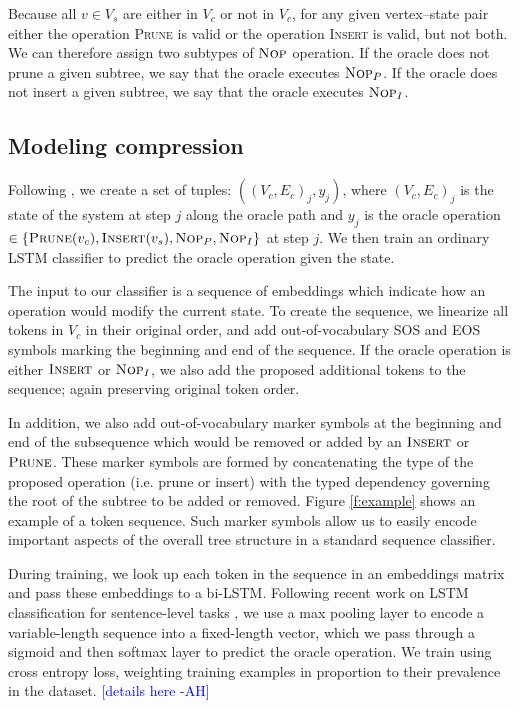 \documentclass[11pt,a4paper]{article}
\newcommand{\ahcomment}[1]{\textcolor{blue}{[#1 -AH]}}
\begin{document}
Because all $v \in V_s$ are either in $V_c$ or not in $V_c$, for any given vertex--state pair either the operation \textsc{Prune} is valid or the operation \textsc{Insert} is valid, but not both. We can therefore assign two subtypes of $\textsc{Nop}$ operation. If the oracle does not prune a given subtree, we say that the oracle executes $\textsc{Nop}_P$. If the oracle does not insert a given subtree, we say that the oracle executes $\textsc{Nop}_I$.

\subsection{Modeling compression}

Following \citet{D14-1082}, we create a set of tuples: ${((V_c,E_c)_j, y_j)}$, where $(V_c,E_c)_j$ is the state of the system at step $j$ along the oracle path and $y_j$ is the oracle operation $\in  \{ \textsc{Prune}(v_c), \textsc{Insert}(v_s), \textsc{Nop}_P, \textsc{Nop}_I \}$ at step $j$. We then train an ordinary LSTM classifier to predict the oracle operation given the state. 

The input to our classifier is a sequence of embeddings which indicate how an operation would modify the current state. To create the sequence, we linearize all tokens in $V_c$ in their original order, and add out-of-vocabulary SOS and EOS symbols marking the beginning and end of the sequence. If the oracle operation is either $\textsc{Insert}$ or $\textsc{Nop}_I$, we also add the proposed additional tokens to the sequence; again preserving original token order.

In addition, we also add out-of-vocabulary marker symbols at the beginning and end of the subsequence which would be removed or added by an $\textsc{Insert}$ or $\textsc{Prune}$. These marker symbols are formed by concatenating the type of the proposed operation (i.e. prune or insert) with the typed dependency governing the root of the subtree to be added or removed. Figure \ref{f:example} shows an example of a token sequence. Such marker symbols allow us to easily encode important aspects of the overall tree structure in a standard sequence classifier. 

During training, we look up each token in the sequence in an embeddings matrix and pass these embeddings to a bi-LSTM. Following recent work on LSTM classification for sentence-level tasks \cite{D17-1070}, we use a max pooling layer to encode a variable-length sequence into a fixed-length vector, which we pass through a sigmoid and then softmax layer to predict the oracle operation. We train using cross entropy loss, weighting training examples in proportion to their prevalence in the dataset. \ahcomment{details here}
\end{document}
